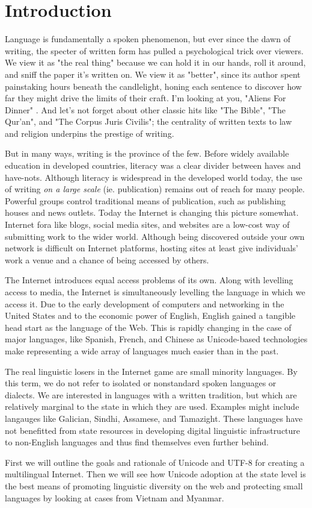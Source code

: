 \section{Introduction}

Language is fundamentally a spoken phenomenon, but ever since the dawn of
writing, the specter of written form has pulled a psychological trick over
viewers. We view it as "the real thing" because we can hold it in our hands,
roll it around, and sniff the paper it's written on. We view it as "better",
since its author spent painstaking hours beneath the candlelight, honing each
sentence to discover how far they might drive the limits of their craft. I'm
looking at you, "Aliens For Dinner" \parencite{spinner94}. And let's not forget
about other classic hits like "The Bible", "The Qur'an", and "The Corpus Juris
Civilis"; the centrality of written texts to law and religion underpins the
prestige of writing.

But in many ways, writing is the province of the few. Before widely available
education in developed countries, literacy was a clear divider between haves and
have-nots. Although literacy is widespread in the developed world today, the use
of writing \textit{on a large scale} (ie. publication) remains out of reach for
many people. Powerful groups control traditional means of publication, such as
publishing houses and news outlets. Today the Internet is changing this picture
somewhat. Internet fora like blogs, social media sites, and websites are a
low-cost way of submitting work to the wider world. Although being discovered
outside your own network is difficult on Internet platforms, hosting sites at
least give individuals' work a venue and a chance of being accessed by others.

The Internet introduces equal access problems of its own. Along with levelling
access to media, the Internet is simultaneously levelling the language in which
we access it. Due to the early development of computers and networking in the
United States and to the economic power of English, English gained a tangible
head start as the language of the Web. This is rapidly changing in the case of
major languages, like Spanish, French, and Chinese as Unicode-based technologies
make representing a wide array of languages much easier than in the past.

The real linguistic losers in the Internet game are small minority languages. By
this term, we do not refer to isolated or nonstandard spoken languages or
dialects. We are interested in languages with a written tradition, but which are
relatively marginal to the state in which they are used. Examples might include
langauges like Galician, Sindhi, Assamese, and Tamazight. These languages have
not benefitted from state resources in developing digital linguistic
infrastructure to non-English languages and thus find themselves even further
behind.

First we will outline the goals and rationale of Unicode and UTF-8 for creating
a multilingual Internet. Then we will see how Unicode adoption at the state
level is the best means of promoting linguistic diversity on the web and
protecting small languages by looking at cases from Vietnam and Myanmar.
